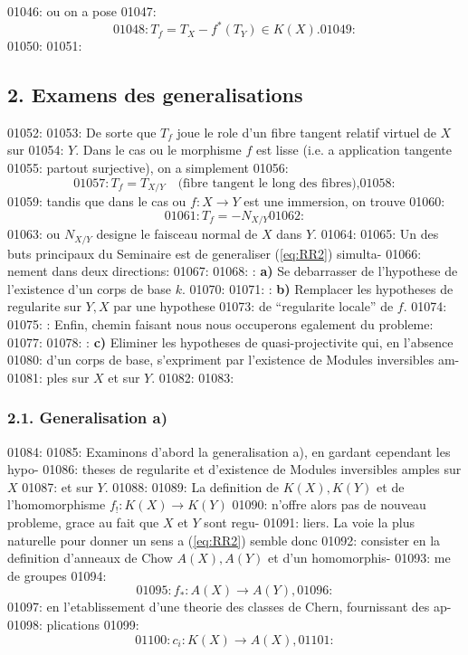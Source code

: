 01046: ou on a pose
01047: \begin{equation}\label{eq:Tf}
01048: T_f = T_X - f^{*}(T_Y) \in K(X).
01049: \end{equation}
01050: 
01051: \subsection*{2. Examens des generalisations}
01052: 
01053: De sorte que $T_f$ joue le role d'un fibre tangent relatif virtuel de $X$ sur
01054: $Y$. Dans le cas ou le morphisme $f$ est lisse (i.e. a application tangente
01055: partout surjective), on a simplement
01056: \[
01057: T_f = T_{X/Y} \quad \text{(fibre tangent le long des fibres),}
01058: \]
01059: tandis que dans le cas ou $f: X \to Y$ est une immersion, on trouve
01060: \[
01061: T_f = -N_{X/Y}
01062: \]
01063: ou $N_{X/Y}$ designe le faisceau normal de $X$ dans $Y$.
01064: 
01065: Un des buts principaux du Seminaire est de generaliser (\ref{eq:RR2}) simulta-
01066: nement dans deux directions:
01067: 
01068: : \textbf{a)} Se debarrasser de l'hypothese de l'existence d'un corps de base $k$.
01070: 
01071: : \textbf{b)} Remplacer les hypotheses de regularite sur $Y, X$ par une hypothese
01073: de ``regularite locale'' de $f$.
01074: 
01075: : Enfin, chemin faisant nous nous occuperons egalement du probleme:
01077: 
01078: : \textbf{c)} Eliminer les hypotheses de quasi-projectivite qui, en l'absence
01080: d'un corps de base, s'expriment par l'existence de Modules inversibles am-
01081: ples sur $X$ et sur $Y$.
01082: 
01083: \subsubsection*{2.1. Generalisation a)}
01084: 
01085: Examinons d'abord la generalisation a), en gardant cependant les hypo-
01086: theses de regularite et d'existence de Modules inversibles amples sur $X$
01087: et sur $Y$.
01088: 
01089: La definition de $K(X), K(Y)$ et de l'homomorphisme $f_{!}: K(X) \to K(Y)$
01090: n'offre alors pas de nouveau probleme, grace au fait que $X$ et $Y$ sont regu-
01091: liers. La voie la plus naturelle pour donner un sens a (\ref{eq:RR2}) semble donc
01092: consister en la definition d'anneaux de Chow $A(X), A(Y)$ et d'un homomorphis-
01093: me de groupes
01094: \[
01095: f_{*}: A(X) \longrightarrow A(Y),
01096: \]
01097: en l'etablissement d'une theorie des classes de Chern, fournissant des ap-
01098: plications
01099: \[
01100: c_i: K(X) \longrightarrow A(X),
01101: \]
